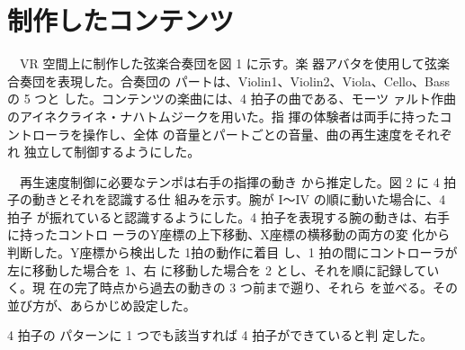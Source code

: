 \documentclass[uplatex]{jsarticle}   %
\begin{document}
\section{制作したコンテンツ}
　VR 空間上に制作した弦楽合奏団を図 1 に示す。楽 器アバタを使用して弦楽合奏団を表現した。合奏団の パートは、Violin1、Violin2、Viola、Cello、Bass の 5 つと した。コンテンツの楽曲には、4 拍子の曲である、モーツ ァルト作曲のアイネクライネ・ナハトムジークを用いた。指 揮の体験者は両手に持ったコントローラを操作し、全体 の音量とパートごとの音量、曲の再生速度をそれぞれ 独立して制御するようにした。

　再生速度制御に必要なテンポは右手の指揮の動き から推定した。図 2 に 4 拍子の動きとそれを認識する仕 組みを示す。腕が I～IV の順に動いた場合に、4 拍子 が振れていると認識するようにした。4 拍子を表現する腕の動きは、右手に持ったコントロ ーラのY座標の上下移動、X座標の横移動の両方の変 化から判断した。Y座標から検出した 1拍の動作に着目 し、1 拍の間にコントローラが左に移動した場合を 1、右 に移動した場合を 2 とし、それを順に記録していく。現 在の完了時点から過去の動きの 3 つ前まで遡り、それら を並べる。その並び方が、あらかじめ設定した。
 
 
 4 拍子の パターンに 1 つでも該当すれば 4 拍子ができていると判 定した。






\end{document}
